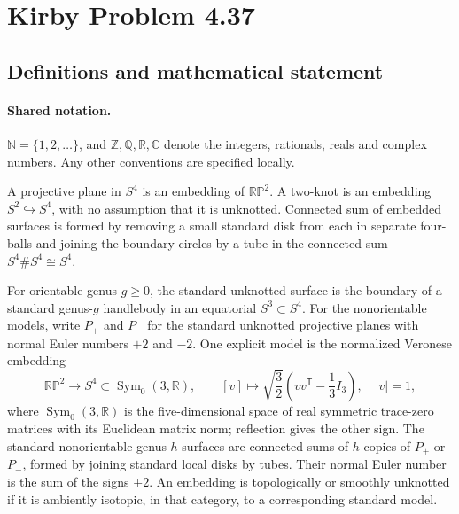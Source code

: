\documentclass[11pt]{article}
\begin{document}
\section{Kirby Problem 4.37}\label{statement}

\subsection{Definitions and mathematical statement}

\paragraph{Shared notation.}$\mathbb N=\{1,2,\ldots\}$, and $\mathbb Z,\mathbb Q,\mathbb R,\mathbb C$ denote the integers, rationals, reals and complex numbers. Any other conventions are specified locally.


A projective plane in $S^4$ is an embedding of $\mathbb{RP}^2$. A two-knot is an embedding $S^2\hookrightarrow S^4$, with no assumption that it is unknotted. Connected sum of embedded surfaces is formed by removing a small standard disk from each in separate four-balls and joining the boundary circles by a tube in the connected sum $S^4\#S^4\cong S^4$.

For orientable genus $g\ge0$, the standard unknotted surface is the boundary of a standard genus-$g$ handlebody in an equatorial $S^3\subset S^4$. For the nonorientable models, write $P_+$ and $P_-$ for the standard unknotted projective planes with normal Euler numbers $+2$ and $-2$. One explicit model is the normalized Veronese embedding
\[
\mathbb{RP}^2\longrightarrow S^4\subset\operatorname{Sym}_0(3,\mathbb R),\qquad
[v]\longmapsto\sqrt{\frac32}\left(vv^{\mathsf T}-\frac13I_3\right),\quad |v|=1,
\]
where $\operatorname{Sym}_0(3,\mathbb R)$ is the five-dimensional space of real symmetric trace-zero matrices with its Euclidean matrix norm; reflection gives the other sign. The standard nonorientable genus-$h$ surfaces are connected sums of $h$ copies of $P_+$ or $P_-$, formed by joining standard local disks by tubes. Their normal Euler number is the sum of the signs $\pm2$. An embedding is topologically or smoothly unknotted if it is ambiently isotopic, in that category, to a corresponding standard model.
\end{document}

